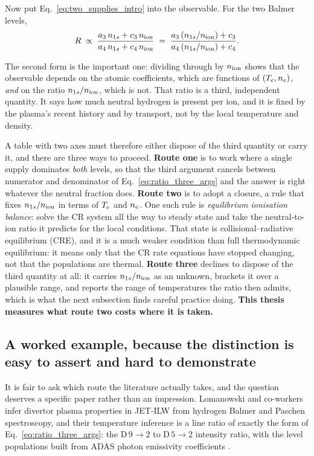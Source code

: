Now put Eq.~\eqref{eq:two_supplies_intro} into the observable. For the two Balmer
levels,
\begin{equation}
  R \;\propto\; \frac{a_3\,n_{1s} + c_3\,n_{\mathrm{ion}}}{a_4\,n_{1s} + c_4\,n_{\mathrm{ion}}}
         \;=\; \frac{a_3\,(n_{1s}/n_{\mathrm{ion}}) + c_3}{a_4\,(n_{1s}/n_{\mathrm{ion}}) + c_4}.
  \label{eq:ratio_three_args}
\end{equation}

\noindent The second form is the important one: dividing through by $n_{\mathrm{ion}}$ shows
that the observable depends on the atomic coefficients, which are functions of
$(T_e,n_e)$, \emph{and} on the ratio $n_{1s}/n_{\mathrm{ion}}$, which is not. That ratio is a
third, independent quantity. It says how much neutral hydrogen is present per
ion, and it is fixed by the plasma's recent history and by transport, not by the
local temperature and density.

A table with two axes must therefore either dispose of the third quantity or
carry it, and there are three ways to proceed. \textbf{Route one} is to work where a single
supply dominates \emph{both} levels, so that the third argument cancels between
numerator and denominator of Eq.~\eqref{eq:ratio_three_args} and the answer is
right whatever the neutral fraction does. \textbf{Route two} is to adopt a
closure, a rule that fixes $n_{1s}/n_{\mathrm{ion}}$ in terms of $T_e$ and $n_e$. One
such rule is \emph{equilibrium ionisation balance}: solve the CR system
all the way to steady state and take the neutral-to-ion ratio it predicts for
the local conditions. That state is collisional--radiative equilibrium (CRE),
and it is a much weaker condition than full thermodynamic equilibrium: it means
only that the CR rate equations have stopped changing, not that the populations
are thermal. \textbf{Route three} declines to dispose of the third quantity at
all: it carries $n_{1s}/n_{\mathrm{ion}}$ as an unknown, brackets it over a plausible range,
and reports the range of temperatures the ratio then admits, which is what the
next subsection finds careful practice doing. \textbf{This thesis measures what
route two costs where it is taken.}

\subsection{A worked example, because the distinction is easy to assert and
hard to demonstrate}
\label{sec:worked_inversion}

It is fair to ask which route the literature actually takes, and the question
deserves a specific paper rather than an impression. Lomanowski and co-workers
infer divertor plasma properties in JET-ILW from hydrogen Balmer and Paschen
spectroscopy, and their temperature inference is a line ratio of exactly the
form of Eq.~\eqref{eq:ratio_three_args}: the $\mathrm{D}\,9\!\to\!2$ to
$\mathrm{D}\,5\!\to\!2$ intensity ratio, with the level populations built from
ADAS photon emissivity coefficients \cite[Sec.~3.2]{Lomanowski2015}.

